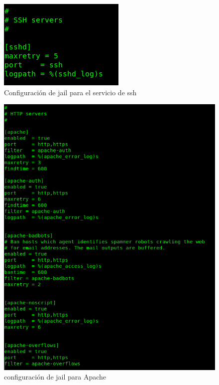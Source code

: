 \documentclass[9pt]{article}
\begin{document}
\begin{figure}[H]
  \centering
  \includegraphics[scale=0.7]{fail2ban/ssh_jail}
  \caption{Configuración de jail para el servicio de ssh}
\end{figure}
\begin{figure}[H]
  \centering
  \includegraphics[scale=0.3]{fail2ban/apache_jails}
  \caption{configuración de jail para Apache}
\end{figure}
\end{document}
